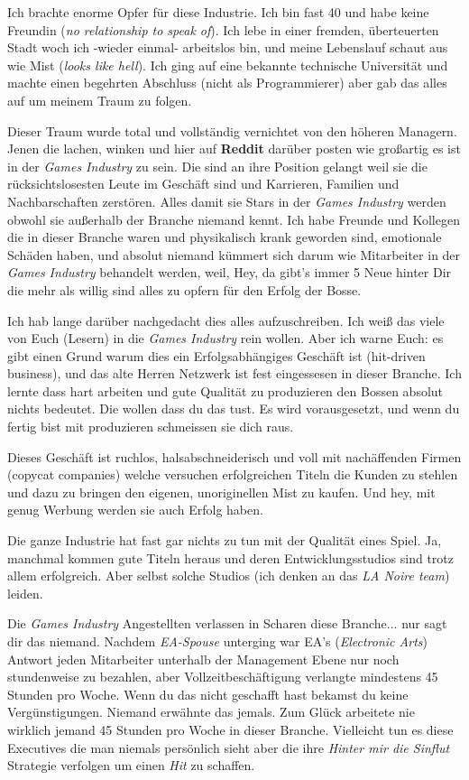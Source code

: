 Ich brachte enorme Opfer für diese Industrie. Ich bin fast 40 und habe keine Freundin  (\textit{no relationship to speak of}). Ich lebe in einer fremden, überteuerten Stadt woch ich -wieder einmal- arbeitslos bin, und meine Lebenslauf schaut aus wie Mist (\textit{looks like hell}). Ich ging auf eine bekannte technische Universität und machte einen begehrten Abschluss (nicht als Programmierer) aber gab das alles auf um meinem Traum zu folgen. 

Dieser Traum wurde total und vollständig vernichtet von den höheren Managern. Jenen die lachen, winken und hier auf \textbf{Reddit} darüber posten wie großartig es ist in der \textit{Games Industry} zu sein. Die sind an ihre Position gelangt weil sie die rücksichtslosesten Leute im Geschäft sind und Karrieren, Familien und Nachbarschaften zerstören. Alles damit sie Stars in der \textit{Games Industry} werden obwohl sie außerhalb der Branche niemand kennt. Ich habe Freunde und Kollegen die in dieser Branche waren und physikalisch krank geworden sind, emotionale Schäden haben, und absolut niemand kümmert sich darum wie Mitarbeiter in der \textit{Games Industry} behandelt werden, weil, Hey, da gibt's immer 5 Neue hinter Dir die mehr als willig sind alles zu opfern für den Erfolg der Bosse.

Ich hab lange darüber nachgedacht dies alles aufzuschreiben. Ich weiß das viele von Euch (Lesern) in die \textit{Games Industry} rein wollen. Aber ich warne Euch: es gibt einen Grund warum dies ein Erfolgsabhängiges Geschäft ist (hit-driven business), und das alte Herren Netzwerk ist fest eingessesen in dieser Branche. Ich lernte dass hart arbeiten und gute Qualität zu produzieren den Bossen absolut nichts bedeutet. Die wollen dass du das tust. Es wird vorausgesetzt, und wenn du fertig bist mit produzieren schmeissen sie dich raus.

Dieses Geschäft ist ruchlos, halsabschneiderisch und voll mit nachäffenden Firmen (copycat companies) welche versuchen erfolgreichen Titeln die Kunden zu stehlen und  dazu zu bringen den eigenen, unoriginellen Mist zu kaufen. Und hey, mit genug Werbung werden sie auch Erfolg haben.

Die ganze Industrie hat fast gar nichts zu tun mit der Qualität eines Spiel. Ja, manchmal kommen gute Titeln heraus und deren Entwicklungsstudios sind trotz allem erfolgreich. Aber selbst solche Studios (ich denken an das \textit{LA Noire team}) leiden.

Die \textit{Games Industry} Angestellten verlassen in Scharen diese Branche... nur sagt dir das niemand. Nachdem\textit{ EA-Spouse} unterging war EA's (\textit{Electronic Arts}) Antwort jeden Mitarbeiter unterhalb der Management Ebene nur noch stundenweise zu bezahlen, aber Vollzeitbeschäftigung verlangte mindestens 45 Stunden pro Woche. Wenn du das nicht geschafft hast bekamst du keine Vergünstigungen. Niemand erwähnte das jemals. Zum Glück arbeitete nie wirklich jemand 45 Stunden pro Woche in dieser Branche. Vielleicht tun es diese Executives die man niemals persönlich sieht aber die ihre \textit{Hinter mir die Sinflut} Strategie verfolgen um einen \textit{Hit} zu schaffen. 


